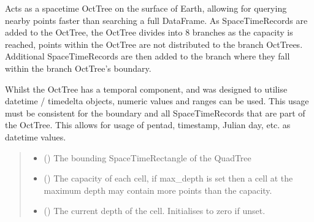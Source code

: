 \documentclass[letterpaper,10pt,english]{sphinxmanual}
\begin{document}
\begin{fulllineitems}
\label{\detokenize{octtree:geotrees.octtree.OctTree}}
\pysigstartsignatures
\pysiglinewithargsret
{}
{\sphinxparamcomma {}\sphinxparamcomma {}\sphinxparamcomma {}}
{}
\pysigstopsignatures
\sphinxAtStartPar
Acts as a space\sphinxhyphen{}time OctTree on the surface of Earth, allowing for querying
nearby points faster than searching a full DataFrame. As SpaceTimeRecords
are added to the OctTree, the OctTree divides into 8 branches as the
capacity is reached, points within the OctTree are not distributed to the
branch OctTrees. Additional SpaceTimeRecords are then added to the branch
where they fall within the branch OctTree’s boundary.

\sphinxAtStartPar
Whilst the OctTree has a temporal component, and was designed to utilise
datetime / timedelta objects, numeric values and ranges can be used. This
usage must be consistent for the boundary and all SpaceTimeRecords that
are part of the OctTree. This allows for usage of pentad, timestamp,
Julian day, etc. as datetime values.
\begin{quote}\begin{description}
\begin{itemize}
\item {}
\sphinxAtStartPar
{} ({\hyperref[\detokenize{shape:geotrees.shape.SpaceTimeRectangle}]{}}) \textendash{} The bounding SpaceTimeRectangle of the QuadTree

\item {}
\sphinxAtStartPar
{} () \textendash{} The capacity of each cell, if max\_depth is set then a cell at the
maximum depth may contain more points than the capacity.

\item {}
\sphinxAtStartPar
{} () \textendash{} The current depth of the cell. Initialises to zero if unset.


\end{itemize}
\end{description}
\end{quote}
\end{fulllineitems}
\end{document}
